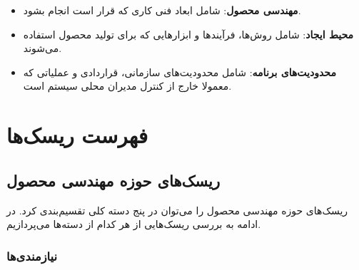 \begin{itemize}
	\item
	\textbf{مهندسی محصول}:
	 شامل ابعاد فنی کاری که قرار است انجام بشود.
	
	\item
	\textbf{محیط ایجاد}:
	 شامل روش‌ها، فرآیندها و ابزارهایی که برای تولید محصول استفاده می‌شوند.
	
	\item
	\textbf{محدودیت‌های برنامه}:
	 شامل محدودیت‌های سازمانی، قراردادی و عملیاتی که معمولا خارج از کنترل مدیران محلی سیستم است.
\end{itemize}

\section{فهرست ریسک‌ها}

\subsection{ریسک‌های حوزه مهندسی محصول}

ریسک‌های حوزه مهندسی محصول را می‌توان در پنج دسته کلی تقسیم‌بندی کرد. در ادامه به بررسی ریسک‌هایی از هر کدام از دسته‌ها می‌پردازیم.


\subsubsection{نیازمندی‌ها}

